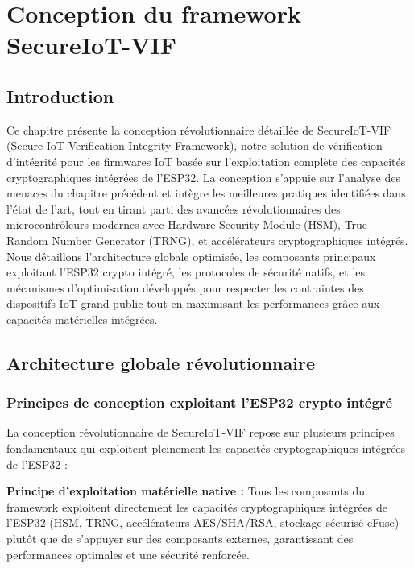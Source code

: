 
\chapter{Conception du framework SecureIoT-VIF}
\label{chap:framework-design}

\section{Introduction}

Ce chapitre présente la conception révolutionnaire détaillée de SecureIoT-VIF (Secure IoT Verification Integrity Framework), notre solution de vérification d'intégrité pour les firmwares IoT basée sur l'exploitation complète des capacités cryptographiques intégrées de l'ESP32. La conception s'appuie sur l'analyse des menaces du chapitre précédent et intègre les meilleures pratiques identifiées dans l'état de l'art, tout en tirant parti des avancées révolutionnaires des microcontrôleurs modernes avec Hardware Security Module (HSM), True Random Number Generator (TRNG), et accélérateurs cryptographiques intégrés. Nous détaillons l'architecture globale optimisée, les composants principaux exploitant l'ESP32 crypto intégré, les protocoles de sécurité natifs, et les mécanismes d'optimisation développés pour respecter les contraintes des dispositifs IoT grand public tout en maximisant les performances grâce aux capacités matérielles intégrées.

\section{Architecture globale révolutionnaire}

\subsection{Principes de conception exploitant l'ESP32 crypto intégré}

La conception révolutionnaire de SecureIoT-VIF repose sur plusieurs principes fondamentaux qui exploitent pleinement les capacités cryptographiques intégrées de l'ESP32 :

\textbf{Principe d'exploitation matérielle native :} Tous les composants du framework exploitent directement les capacités cryptographiques intégrées de l'ESP32 (HSM, TRNG, accélérateurs AES/SHA/RSA, stockage sécurisé eFuse) plutôt que de s'appuyer sur des composants externes, garantissant des performances optimales et une sécurité renforcée.

